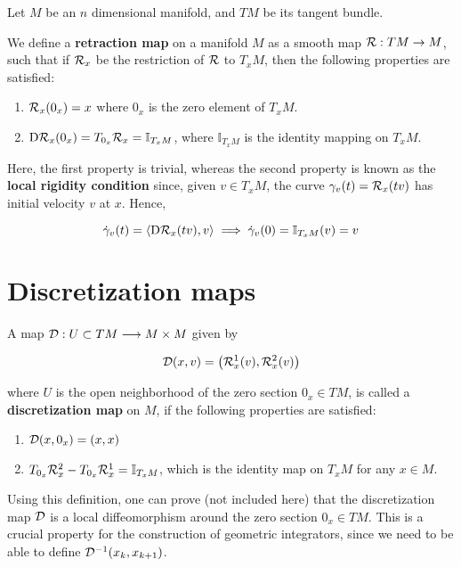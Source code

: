 Let $M$ be an $n$ dimensional manifold, and $TM$ be its tangent bundle.

\begin{defn}\label{defn:retraction}
We define a \textbf{retraction map} on a manifold $M$ as a smooth map $\mathcal{R}: TM \to M$, such that if $\mathcal{R}_x$ be the restriction of $\mathcal{R}$ to $T_x M$, then the following properties are satisfied:

    \begin{enumerate}
        \item $\mathcal{R}_x (0_x) = x$ where $0_x$ is the zero element of $T_x M$.
        \item $\text{D}\mathcal{R}_x (0_x ) = T_{0_x} \mathcal{R}_x = \mathbb{I}_{T_x M} $, where $\mathbb{I}_{T_x M}$ is the identity mapping on $T_x M$.
    \end{enumerate}
\end{defn}

Here, the first property is trivial, whereas the second property is known as the \textbf{local rigidity condition} since, given $v \in T_x M$, the curve $\gamma_v(t) = \mathcal{R}_x(tv)$ has initial velocity $v$ at $x$. Hence,

\[
  \dot{\gamma}_v (t) = \langle \text{D}\mathcal{R}_x (tv) , v \rangle \implies \dot{\gamma}_v (0) = \mathbb{I}_{T_x M}(v) = v
\]

\section{Discretization maps}

\begin{defn}
A map $\mathcal{D} : U \subset TM \longrightarrow M \times M$ given by 

\[
  \mathcal{D} (x,v) = \left( \mathcal{R}^1_x(v), \mathcal{R}^2_x(v) \right)
\]

where $U$ is the open neighborhood of the zero section $0_x \in TM$, is called a \textbf{discretization map} on $M$, if the following properties are satisfied:

\begin{enumerate}
  \item $\mathcal{D}(x,0_x) = (x,x)$ 
  \item $T_{0_x}\mathcal{R}_x^2 - T_{0_x}\mathcal{R}_x^1 = \mathbb{I}_{T_x M}$, which is the identity map on $T_x M$ for any $x \in M$.
\end{enumerate}
\end{defn}

Using this definition, one can prove (not included here) that the discretization map $\mathcal{D}$ is a local diffeomorphism around the zero section $0_x \in TM$. This is a crucial property for the construction of geometric integrators, since we need to be able to define $\mathcal{D}^{-1} (x_k, x_{k+1})$.

